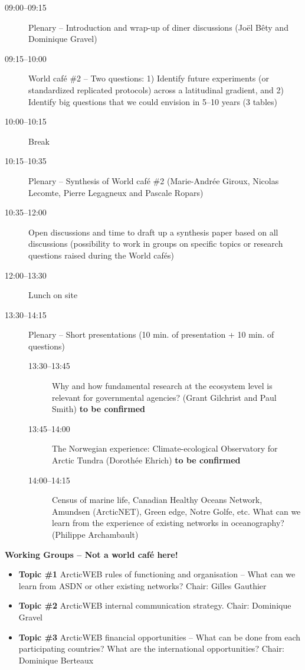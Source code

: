 \documentclass[10pt,letterpaper]{article}
\begin{document}
\begin{description}

    \item[09:00--09:15] Plenary -- Introduction and wrap-up of diner discussions (Joël Bêty and Dominique Gravel)
    \item[09:15--10:00] World café \#2 -- Two questions: 1) Identify future experiments (or standardized replicated protocols) across a latitudinal gradient, and 2) Identify big questions that we could envision in 5--10 years (3 tables)
    \item[10:00--10:15] Break
    \item[10:15--10:35] Plenary -- Synthesis of World café \#2 (Marie-Andrée Giroux, Nicolas Lecomte, Pierre Legagneux and Pascale Ropars)
    \item[10:35--12:00] Open discussions and time to draft up a synthesis paper based on all discussions (possibility to work in groups on specific topics or research questions raised during the World cafés)
    \item[12:00--13:30] Lunch on site

    \item[13:30--14:15] Plenary -- Short presentations (10 min. of presentation + 10 min. of questions)

    \begin{description}
        \item[13:30--13:45] Why and how fundamental research at the ecosystem level is relevant for governmental agencies? (Grant Gilchrist and Paul Smith) \textbf{to be confirmed}
        \item[13:45--14:00] The Norwegian experience: Climate-ecological Observatory for Arctic Tundra (Dorothée Ehrich) \textbf{to be confirmed}
        \item[14:00--14:15] Census of marine life, Canadian Healthy Oceans Network, Amundsen (ArcticNET), Green edge, Notre Golfe, etc. What can we learn from the experience of existing networks in oceanography? (Philippe Archambault)
    \end{description}

\end{description}

\newpage

\noindent \textbf{Working Groups -- Not a world café here!}

\begin{itemize}
    \item \textbf{Topic \#1} ArcticWEB rules of functioning and organisation -- What can we learn from ASDN or other existing networks? Chair: Gilles Gauthier
    \item \textbf{Topic \#2} ArcticWEB internal communication strategy. Chair: Dominique Gravel
    \item \textbf{Topic \#3} ArcticWEB financial opportunities -- What can be done from each participating countries? What are the international opportunities? Chair: Dominique Berteaux
\end{itemize}
\end{document}
